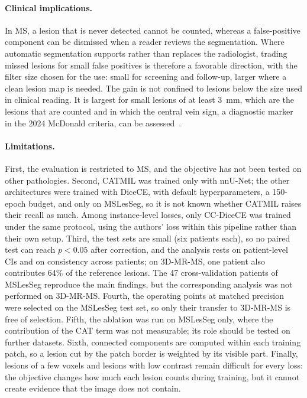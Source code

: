 \paragraph{Clinical implications.}
In MS, a lesion that is never detected cannot be counted, whereas a
false-positive component can be dismissed when a reader reviews the
segmentation. Where automatic segmentation supports rather than replaces
the radiologist, trading missed lesions for small false positives is
therefore a favorable direction, with the filter size chosen for the use:
small for screening and follow-up, larger where a clean lesion map is
needed. The gain is not confined to lesions below the size used in
clinical reading. It is largest for small lesions of at least 3~mm, which
are the lesions that are counted and in which the central vein sign, a
diagnostic marker in the 2024 McDonald criteria, can be
assessed~\cite{montalban_diagnosis_2025,barkhof_2024_2025}.

\paragraph{Limitations.}
First, the evaluation is restricted to MS, and the objective has not been
tested on other pathologies. Second, CATMIL was trained only with nnU-Net;
the other architectures were trained with DiceCE, with default
hyperparameters, a 150-epoch budget, and only on MSLesSeg, so it is not
known whether CATMIL raises their recall as much. Among instance-level
losses, only CC-DiceCE was trained under the same protocol, using the
authors' loss within this pipeline rather than their own setup. Third, the
test sets are small (six patients each), so no paired test can reach
$p < 0.05$ after correction, and the analysis rests on patient-level CIs
and on consistency across patients; on 3D-MR-MS, one patient also
contributes 64\% of the reference lesions. The 47 cross-validation
patients of MSLesSeg reproduce the main findings, but the corresponding
analysis was not performed on 3D-MR-MS. Fourth, the operating points at
matched precision were selected on the MSLesSeg test set, so only their
transfer to 3D-MR-MS is free of selection. Fifth, the ablation was run on
MSLesSeg only, where the contribution of the CAT term was not measurable;
its role should be tested on further datasets.
Sixth, connected components are computed within each training patch, so a
lesion cut by the patch border is weighted by its visible part. Finally,
lesions of a few voxels and lesions with low contrast remain difficult for
every loss: the objective changes how much each lesion counts during
training, but it cannot create evidence that the image does not contain.
